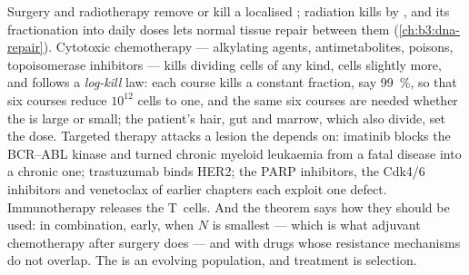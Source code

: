 \begin{example}\label{ex:b3:cancer-biology:therapy}
Surgery and radiotherapy remove or kill a localised ; radiation
kills by , and its fractionation into daily doses
lets normal tissue repair between them (\cref{ch:b3:dna-repair}).
Cytotoxic chemotherapy --- alkylating agents, antimetabolites,
 poisons, topoisomerase inhibitors --- kills dividing cells
of any kind,  cells slightly more, and follows a
\emph{log-kill} law: each course kills a constant fraction, say
\qty{99}{\%}, so that six courses reduce $10^{12}$ cells to one, and
the same six courses are needed whether the  is large or small;
the patient's hair, gut and marrow, which also divide, set the dose.
Targeted therapy attacks a lesion the  depends on: imatinib
blocks the BCR--ABL kinase and turned chronic myeloid leukaemia from a
fatal disease into a chronic one; trastuzumab binds HER2; the PARP
inhibitors, the Cdk4/6 inhibitors and venetoclax of earlier chapters
each exploit one defect. Immunotherapy releases the T~cells. And the
theorem says how they should be used: in combination, early, when $N$
is smallest --- which is what adjuvant chemotherapy after surgery does
--- and with drugs whose resistance mechanisms do not overlap. The
 is an evolving population, and treatment is selection.
\end{example}

